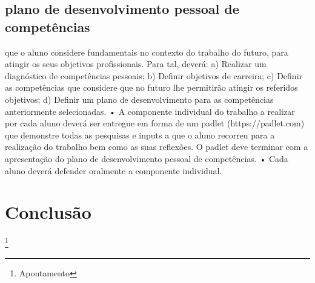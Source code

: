 \subsection{plano de desenvolvimento pessoal de competências}

que o aluno considere
fundamentais no contexto do trabalho do futuro, para atingir os seus objetivos
profissionais. Para tal, deverá:
a) Realizar um diagnóstico de competências pessoais;
b) Definir objetivos de carreira;
c) Definir as competências que considere que no futuro lhe permitirão atingir os
referidos objetivos;
d) Definir um plano de desenvolvimento para as competências anteriormente
selecionadas.
• A componente individual do trabalho a realizar por cada aluno deverá ser entregue em forma de um padlet (https://padlet.com) que demonstre todas as pesquisas e inputs a que o aluno recorreu para a realização do trabalho bem como as suas reflexões. O padlet deve terminar com a apresentação do plano de
desenvolvimento pessoal de competências.
• Cada aluno deverá defender oralmente a componente individual.


\newpage
\section{Conclusão}
\newpage
%
%
\listoffigures
\cite{*}

\newpage
\footnote{Apontamento}


